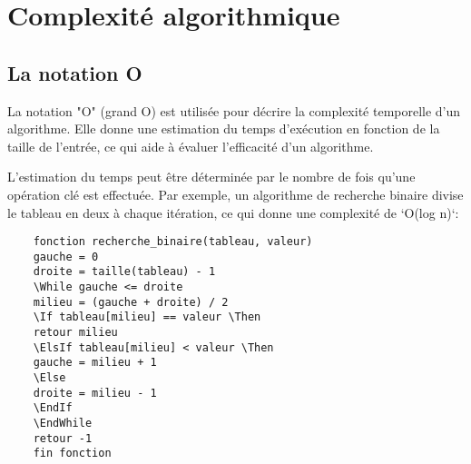 %


\chapter{Complexité algorithmique}


\section{La notation O}
La notation "O" (grand O) est utilisée pour décrire la complexité temporelle d'un algorithme. Elle donne une estimation du temps d'exécution en fonction de la taille de l'entrée, ce qui aide à évaluer l'efficacité d'un algorithme. 

L'estimation du temps peut être déterminée par le nombre de fois qu'une opération clé est effectuée. Par exemple, un algorithme de recherche binaire divise le tableau en deux à chaque itération, ce qui donne une complexité de `O(log n)`:

\begin{lstlisting}
	fonction recherche_binaire(tableau, valeur)
	gauche = 0
	droite = taille(tableau) - 1
	\While gauche <= droite
	milieu = (gauche + droite) / 2
	\If tableau[milieu] == valeur \Then
	retour milieu
	\ElsIf tableau[milieu] < valeur \Then
	gauche = milieu + 1
	\Else
	droite = milieu - 1
	\EndIf
	\EndWhile
	retour -1
	fin fonction
\end{lstlisting}

